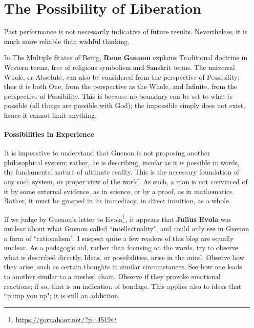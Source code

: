 \section{The Possibility of Liberation}

\begin{quotex}
Past performance is not necessarily indicative of future results. Nevertheless, it is much more reliable than wishful thinking. 

\end{quotex}
In The Multiple States of Being, \textbf{Rene Guenon} explains Traditional doctrine in Western terms, free of religious symbolism and Sanskrit terms. The universal Whole, or Absolute, can also be considered from the perspective of Possibility; thus it is both One, from the perspective as the Whole, and Infinite, from the perspective of Possibility. This is because no boundary can be set to what is possible (all things are possible with God); the impossible simply does not exist, hence it cannot limit anything.

\paragraph{Possibilities in Experience}
It is imperative to understand that Guenon is not proposing another philosophical system; rather, he is describing, insofar as it is possible in words, the fundamental nature of ultimate reality. This is the necessary foundation of any such system, or proper view of the world. As such, a man is not convinced of it by some external evidence, as in science, or by a proof, as in mathematics. Rather, it must be grasped in its immediacy, in direct intuition, as a whole.

If we judge by Guenon's letter to Evola\footnote{\url{https://gornahoor.net/?p=4519}}, it appears that \textbf{Julius Evola} was unclear about what Guenon called ``intellectuality", and could only see in Guenon a form of ``rationalism". I suspect quite a few readers of this blog are equally unclear. As a pedagogic aid, rather than focusing on the words, try to observe what is described directly. Ideas, or possibilities, arise in the mind. Observe how they arise, such as certain thoughts in similar circumstances. See how one leads to another similar to a meshed chain. Observe if they provoke emotional reactions; if so, that is an indication of bondage. This applies also to ideas that ``pump you up"; it is still an addiction.

